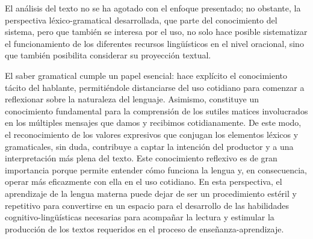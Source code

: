 El análisis del texto no se ha agotado con el enfoque presentado; no obstante,
la perspectiva léxico-gramatical desarrollada, que parte del conocimiento del
sistema, pero que también se interesa por el uso, no solo hace posible
sistematizar el funcionamiento de los diferentes recursos lingüísticos en el
nivel oracional, sino que también posibilita considerar su proyección textual.

\begin{recuadro}
El saber gramatical cumple un papel esencial: hace explícito el conocimiento
tácito del hablante, permitiéndole distanciarse del uso cotidiano para comenzar
a reflexionar sobre la naturaleza del lenguaje. Asimismo, constituye un
conocimiento fundamental para la comprensión de los sutiles matices
involucrados en los múltiples mensajes que damos y recibimos cotidianamente. De
este modo, el reconocimiento de los valores expresivos que conjugan los
elementos léxicos y gramaticales, sin duda, contribuye a captar la intención
del productor y a una interpretación más plena del texto. Este conocimiento
reflexivo es de gran importancia porque permite entender cómo funciona la
lengua y, en consecuencia, operar más eficazmente con ella en el uso cotidiano.
En esta perspectiva, el aprendizaje de la lengua materna puede dejar de ser un
procedimiento estéril y repetitivo para convertirse en un espacio para el
desarrollo de las habilidades cognitivo-lingüísticas necesarias para acompañar
la lectura y estimular la producción de los textos requeridos en el proceso de
enseñanza-aprendizaje.
\end{recuadro}

\lecturasrecomendadas

\solucionario

